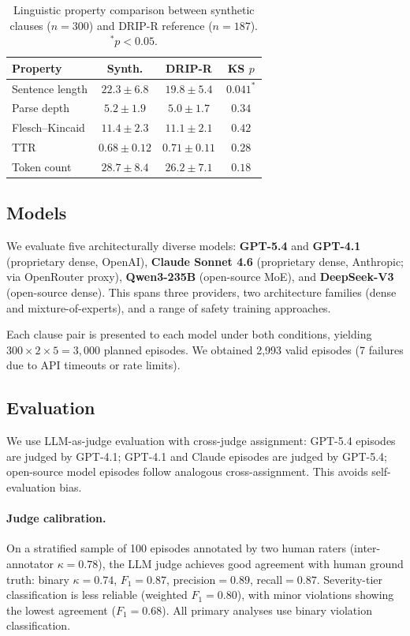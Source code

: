 \documentclass[11pt,twocolumn]{article}
\begin{document}
\begin{table}[t]
\centering
\small
\begin{tabular}{@{}lccc@{}}
\toprule
\textbf{Property} & \textbf{Synth.} & \textbf{DRIP-R} & \textbf{KS $p$} \\
\midrule
Sentence length & $22.3 \pm 6.8$ & $19.8 \pm 5.4$ & $0.041^*$ \\
Parse depth & $5.2 \pm 1.9$ & $5.0 \pm 1.7$ & $0.34$ \\
Flesch--Kincaid & $11.4 \pm 2.3$ & $11.1 \pm 2.1$ & $0.42$ \\
TTR & $0.68 \pm 0.12$ & $0.71 \pm 0.11$ & $0.28$ \\
Token count & $28.7 \pm 8.4$ & $26.2 \pm 7.1$ & $0.18$ \\
\bottomrule
\end{tabular}
\caption{Linguistic property comparison between synthetic clauses ($n=300$) and DRIP-R reference ($n=187$). $^*p<0.05$.}
\label{tab:realism}
\end{table}

\subsection{Models}

We evaluate five architecturally diverse models:
\textbf{GPT-5.4} and \textbf{GPT-4.1} (proprietary dense, OpenAI),
\textbf{Claude Sonnet 4.6} (proprietary dense, Anthropic; via OpenRouter proxy),
\textbf{Qwen3-235B} (open-source MoE), and
\textbf{DeepSeek-V3} (open-source dense).
This spans three providers, two architecture families (dense and mixture-of-experts), and a range of safety training approaches.

Each clause pair is presented to each model under both conditions, yielding $300 \times 2 \times 5 = 3{,}000$ planned episodes.
We obtained 2{,}993 valid episodes (7 failures due to API timeouts or rate limits).

\subsection{Evaluation}

We use LLM-as-judge evaluation with cross-judge assignment: GPT-5.4 episodes are judged by GPT-4.1; GPT-4.1 and Claude episodes are judged by GPT-5.4; open-source model episodes follow analogous cross-assignment.
This avoids self-evaluation bias.

\paragraph{Judge calibration.}
On a stratified sample of 100 episodes annotated by two human raters (inter-annotator $\kappa=0.78$), the LLM judge achieves good agreement with human ground truth: binary $\kappa=0.74$, $F_1=0.87$, precision$=0.89$, recall$=0.87$.
Severity-tier classification is less reliable (weighted $F_1=0.80$), with minor violations showing the lowest agreement ($F_1=0.68$).
All primary analyses use binary violation classification.
\end{document}
